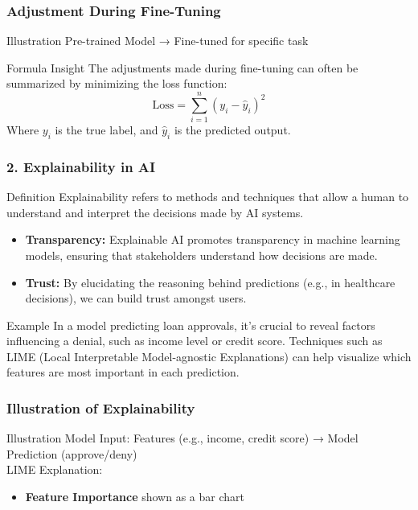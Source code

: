 \documentclass[aspectratio=169]{beamer}
\begin{document}
\begin{frame}[fragile]
    \frametitle{Adjustment During Fine-Tuning}
    \begin{block}{Illustration}
        Pre-trained Model → Fine-tuned for specific task
    \end{block}
    
    \begin{block}{Formula Insight}
        The adjustments made during fine-tuning can often be summarized by minimizing the loss function:  
        \begin{equation}
            \text{Loss} = \sum_{i=1}^{n} (y_i - \hat{y}_i)^2 
        \end{equation}
        Where \( y_i \) is the true label, and \( \hat{y}_i \) is the predicted output.
    \end{block}
\end{frame}

\begin{frame}[fragile]
    \frametitle{2. Explainability in AI}
    \begin{block}{Definition}
        Explainability refers to methods and techniques that allow a human to understand and interpret the decisions made by AI systems. 
    \end{block}

    \begin{itemize}
        \item \textbf{Transparency:} 
            Explainable AI promotes transparency in machine learning models, ensuring that stakeholders understand how decisions are made.
        
        \item \textbf{Trust:} 
            By elucidating the reasoning behind predictions (e.g., in healthcare decisions), we can build trust amongst users.
    \end{itemize}

    \begin{block}{Example}
        In a model predicting loan approvals, it's crucial to reveal factors influencing a denial, such as income level or credit score. Techniques such as LIME (Local Interpretable Model-agnostic Explanations) can help visualize which features are most important in each prediction.
    \end{block}
\end{frame}

\begin{frame}[fragile]
    \frametitle{Illustration of Explainability}
    \begin{block}{Illustration}
        Model Input: Features (e.g., income, credit score) → Model Prediction (approve/deny)  
        \\
        LIME Explanation: 
        \begin{itemize}
            \item \textbf{Feature Importance} shown as a bar chart
        \end{itemize}
    \end{block}
\end{frame}
\end{document}

